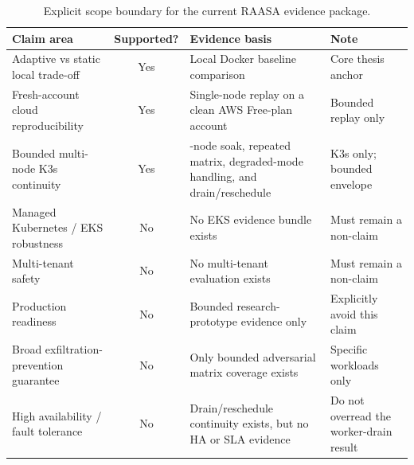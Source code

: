 \begin{table}[t]
\centering
\footnotesize
\setlength{\tabcolsep}{3.4pt}
\renewcommand{\arraystretch}{1.08}
\caption{Explicit scope boundary for the current RAASA evidence package.}
\label{tab:scope-nonclaims}
\begin{tabularx}{\columnwidth}{p{} c >{\raggedright\arraybackslash}X p{}}
\toprule
Claim area & Supported? & Evidence basis & Note \\
\midrule
Adaptive vs static local trade-off & Yes & Local Docker baseline comparison & Core thesis anchor \\
Fresh-account cloud reproducibility & Yes & Single-node replay on a clean AWS Free-plan account & Bounded replay only \\
Bounded multi-node K3s continuity & Yes & 3-node soak, repeated matrix, degraded-mode handling, and drain/reschedule & K3s only; bounded envelope \\
Managed Kubernetes / EKS robustness & No & No EKS evidence bundle exists & Must remain a non-claim \\
Multi-tenant safety & No & No multi-tenant evaluation exists & Must remain a non-claim \\
Production readiness & No & Bounded research-prototype evidence only & Explicitly avoid this claim \\
Broad exfiltration-prevention guarantee & No & Only bounded adversarial matrix coverage exists & Specific workloads only \\
High availability / fault tolerance & No & Drain/reschedule continuity exists, but no HA or SLA evidence & Do not overread the worker-drain result \\
\bottomrule
\end{tabularx}
\end{table}

